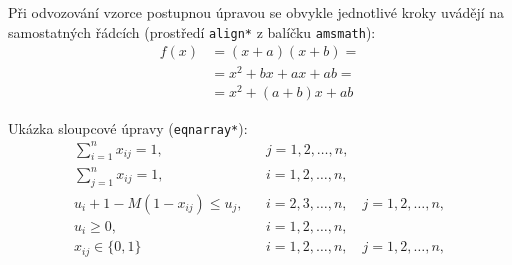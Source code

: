 Při odvozování vzorce postupnou úpravou se obvykle jednotlivé kroky uvádějí na samostatných řádcích (prostředí \verb'align*' z balíčku \verb|amsmath|):
\begin{align*}
 f(x) &= (x+a)(x+b) =\\
      &= x^2 + bx + ax + ab =\\
      &= x^2 + (a+b)x + ab
\end{align*}

Ukázka sloupcové úpravy (\verb|eqnarray*|):
\begin{eqnarray*}
\sum_{i=1}^n x_{ij} =1, && j=1,2,\dots,n,\\
\sum_{j=1}^n x_{ij} =1, && i=1,2,\dots,n,\\
u_i + 1 - M(1 - x_{ij}) \le u_j, && i=2,3,\dots,n,\quad j=1,2,\dots,n,\\
u_i \ge 0,              && i=1,2,\dots,n,\\
x_{ij} \in \{0,1\} && i=1,2,\dots,n,\quad j=1,2,\dots,n,\\
\end{eqnarray*}